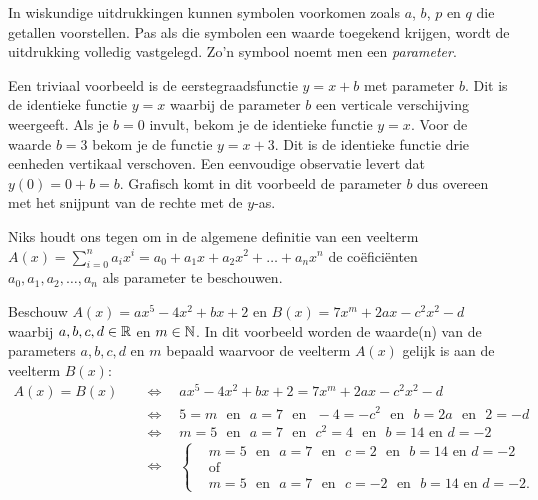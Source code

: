 \documentclass{ximera}
\begin{document}
	\author{Koen de Naeghel - Wiskunde Op Maat}
    \xmsource



In wiskundige uitdrukkingen kunnen symbolen voorkomen zoals $a$, $b$, $p$ en $q$ die getallen voorstellen. Pas als die symbolen een waarde toegekend krijgen, wordt de uitdrukking volledig vastgelegd. Zo'n symbool noemt men een \textit{ parameter}. 

Een triviaal voorbeeld is de eerstegraadsfunctie \(y = x + b\) met parameter \(b\). Dit is de identieke functie \(y = x\) waarbij de parameter \(b\) een verticale verschijving weergeeft. Als je \(b = 0\) invult, bekom je de identieke functie \(y = x\). Voor de waarde \(b =3\) bekom je de functie \(y = x+3\). Dit is de identieke functie drie eenheden vertikaal verschoven. Een eenvoudige observatie levert dat \(y(0) = 0 + b = b\). Grafisch komt in dit voorbeeld de parameter \(b\) dus overeen met het snijpunt van de rechte met de \(y\)-as. 

Niks houdt ons tegen om in de algemene definitie van een veelterm \(A(x) = \sum_{i=0}^n a_i x^i = a_0 + a_1x + a_2x^2 + \dots + a_n x^n\) de coëficiënten $a_0, a_1, a_2, \ldots, a_n$  als parameter te beschouwen.  

\begin{example} 
Beschouw $A(x) = ax^5 - 4x^2 + bx + 2$ en $B(x) = 7x^m + 2ax - c^2x^2 - d$ waarbij $a,b,c,d \in \mathbb{R}$ en $m \in \mathbb{N}$. In dit voorbeeld worden de waarde(n) van de parameters $a,b,c,d$ en $m$ bepaald waarvoor de veelterm $A(x)$ gelijk is aan de veelterm $B(x)$: 
\begin{align*}
A(x) = B(x) \quad 
& \Leftrightarrow \quad ax^5 - 4x^2 + bx + 2 = 7x^m + 2ax - c^2x^2 - d \\
& \Leftrightarrow \quad 5 = m \,\,\text{ en }\,\, a = 7 \,\,\text{ en }\,\, -4 = -c^2 \,\,\text{ en }\,\, b = 2a \,\,\text{ en }\,\, 2 = -d \\
& \Leftrightarrow \quad m=5 \,\,\text{ en }\,\, a = 7 \,\,\text{ en }\,\, c^2 = 4 \,\,\text{ en }\,\, b = 14 \text{ en } d = -2 \\
& \Leftrightarrow \quad 
\left\{
\begin{aligned}
& m=5 \,\,\text{ en }\,\, a = 7 \,\,\text{ en }\,\, c = 2 \,\,\text{ en }\,\, b = 14 \text{ en } d = -2 \\
& \text{of} \\
& m=5 \,\,\text{ en }\,\, a = 7 \,\,\text{ en }\,\, c = -2 \,\,\text{ en }\,\, b = 14 \text{ en } d = -2.
\end{aligned}
\right.
\end{align*}
\end{example} 
\end{document}
